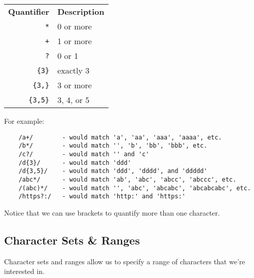 \begin{center}
    \begin{small}
        \begin{tabularx}{\textwidth}{r l}
            \textbf{Quantifier}   & \textbf{Description} \\
            \texttt{*}          & 0 or more \\
            \texttt{+}          & 1 or more \\
            \texttt{?}          & 0 or 1 \\
            \texttt{\{3\}}      & exactly 3 \\
            \texttt{\{3,\}}     & 3 or more \\
            \texttt{\{3,5\}}   & 3, 4, or 5
        \end{tabularx}
    \end{small}
\end{center}

For example:

\begin{verbatim}
    /a+/        - would match 'a', 'aa', 'aaa', 'aaaa', etc.
    /b*/        - would match '', 'b', 'bb', 'bbb', etc.
    /c?/        - would match '' and 'c'
    /d{3}/      - would match 'ddd'
    /d{3,5}/    - would match 'ddd', 'dddd', and 'ddddd'
    /abc*/      - would match 'ab', 'abc', 'abcc', 'abccc', etc.
    /(abc)*/    - would match '', 'abc', 'abcabc', 'abcabcabc', etc.
    /https?:/   - would match 'http:' and 'https:'
\end{verbatim}

Notice that we can use brackets to quantify more than one character.

\pagebreak

\subsection{Character Sets \& Ranges}

Character sets and ranges allow us to specify a range of characters that we're interested in.

